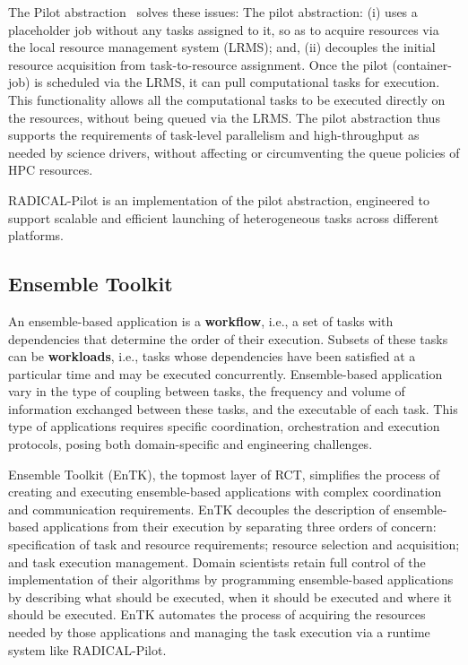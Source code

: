 \documentclass[conference]{IEEEtran}
\begin{document}
The Pilot abstraction~\cite{turilli2017comprehensive} solves these issues:
The pilot abstraction: (i) uses a placeholder job without any tasks assigned
to it, so as to acquire resources via the local resource management system
(LRMS); and, (ii) decouples the initial resource acquisition from
task-to-resource assignment. Once the pilot (container-job) is scheduled via
the LRMS, it can pull computational tasks for execution. This functionality
allows all the computational tasks to be executed directly on the resources,
without being queued via the LRMS\@. %
The pilot abstraction thus supports the requirements of task-level
parallelism and high-throughput as needed by science drivers, without
affecting or circumventing the queue policies of HPC resources.

RADICAL-Pilot is an implementation of the pilot abstraction, engineered to
support scalable and efficient launching of heterogeneous tasks across
different platforms. %
\subsection{Ensemble Toolkit}

An ensemble-based application is a \textbf{workflow}, i.e., a set of tasks
with dependencies that determine the order of their execution. Subsets of
these tasks can be \textbf{workloads}, i.e., tasks whose dependencies have
been satisfied at a particular time and may be executed concurrently.
Ensemble-based application vary in the type of coupling between tasks, the
frequency and volume of information exchanged between these tasks, and the
executable of each task. This type of applications requires specific
coordination, orchestration and execution protocols, posing both
domain-specific and engineering challenges.

Ensemble Toolkit (EnTK), the topmost layer of RCT, simplifies the process of
creating and executing ensemble-based applications with complex coordination
and communication requirements. EnTK decouples the description of
ensemble-based applications from their execution by separating three orders
of concern: specification of task and resource requirements; resource
selection and acquisition; and task execution management. Domain scientists
retain full control of the implementation of their algorithms by programming
ensemble-based applications by describing what should be executed, when it
should be executed and where it should be executed. EnTK automates the
process of acquiring the resources needed by those applications and managing
the task execution via a runtime system like RADICAL-Pilot.
\end{document}
